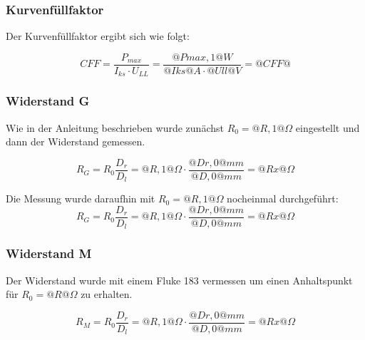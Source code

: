 \documentclass{article}
\begin{document}
\subsubsection{Kurvenfüllfaktor}

Der Kurvenfüllfaktor ergibt sich wie folgt: 

$$CFF=\frac{P_{max}}{I_{ks}\cdot U_{LL}}=\frac{@Pmax,1@ W}{@Iks@ A \cdot @Ull@ V}=@CFF@$$


\subsubsection{Widerstand G}


Wie in der Anleitung beschrieben wurde zunächst $R_0=@R,1@\Omega$ eingestellt und dann der Widerstand gemessen. 


$$R_G=R_0\frac{D_r}{D_l}=@R,1@ \Omega \cdot \frac{@Dr,0@ mm}{@D,0@ mm} = @Rx@ \Omega$$

%

Die Messung wurde daraufhin mit $R_0=@R,1@\Omega$ nocheinmal durchgeführt: 
$$R_G=R_0\frac{D_r}{D_l}=@R,1@ \Omega \cdot \frac{@Dr,0@ mm}{@D,0@ mm} = @Rx@ \Omega$$


\subsubsection{Widerstand M}

Der Widerstand wurde mit einem Fluke 183 vermessen um einen 
Anhaltspunkt für $R_0=@R@\Omega$ zu erhalten.

$$R_M=R_0\frac{D_r}{D_l}=@R,1@ \Omega \cdot \frac{@Dr,0@ mm}{@D,0@ mm} = @Rx@ \Omega$$
\end{document}
